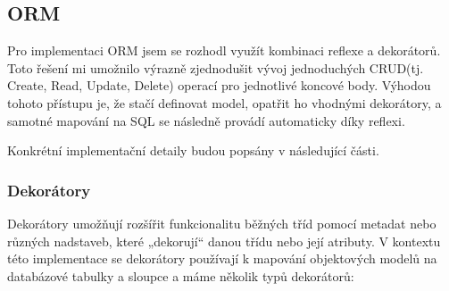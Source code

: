 \subsection{ORM}
Pro implementaci ORM jsem se rozhodl využít kombinaci reflexe a dekorátorů. Toto řešení mi umožnilo výrazně zjednodušit vývoj jednoduchých CRUD(tj. Create, Read, Update, Delete) operací pro jednotlivé koncové body. Výhodou tohoto přístupu je, že stačí definovat model, opatřit ho vhodnými dekorátory, a samotné mapování na SQL se následně provádí automaticky díky reflexi.

Konkrétní implementační detaily budou popsány v následující části.

\subsubsection{Dekorátory}
Dekorátory umožňují rozšířit funkcionalitu běžných tříd pomocí metadat nebo různých nadstaveb, které „dekorují“ danou třídu nebo její atributy\cite{TSDecorators}. V kontextu této implementace se dekorátory používají k mapování objektových modelů na databázové tabulky a sloupce a máme  několik typů dekorátorů:
